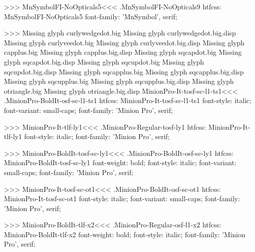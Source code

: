 {>>>
\<MnSymbolFI-NoOpticals5\><<<
.MnSymbolFI-NoOpticals9
htfcss:  MnSymbolFI-NoOpticals5  font-family: 'MnSymbol', serif;

>>>
Missing glyph	curlywedgedot.big
Missing glyph	curlywedgedot.big.disp
Missing glyph	curlyveedot.big
Missing glyph	curlyveedot.big.disp
Missing glyph	capplus.big
Missing glyph	capplus.big.disp
Missing glyph	sqcapdot.big
Missing glyph	sqcapdot.big.disp
Missing glyph	sqcupdot.big
Missing glyph	sqcupdot.big.disp
Missing glyph	sqcapplus.big
Missing glyph	sqcapplus.big.disp
Missing glyph	sqcupplus.big
Missing glyph	sqcupplus.big.disp
Missing glyph	otriangle.big
Missing glyph	otriangle.big.disp
\<MinionPro-It-tosf-sc-l1-ts1\><<<
.MinionPro-BoldIt-osf-sc-l1-ts1
htfcss:  MinionPro-It-tosf-sc-l1-ts1  font-style: italic; font-variant: small-caps; font-family: 'Minion Pro', serif;

>>>
\<MinionPro-It-tlf-ly1\><<<
.MinionPro-Regular-tosf-ly1
htfcss:  MinionPro-It-tlf-ly1  font-style: italic; font-family: 'Minion Pro', serif;

>>>
\<MinionPro-BoldIt-tosf-sc-ly1\><<<
.MinionPro-BoldIt-osf-sc-ly1
htfcss:  MinionPro-BoldIt-tosf-sc-ly1  font-weight: bold; font-style: italic; font-variant: small-caps; font-family: 'Minion Pro', serif;

>>>
\<MinionPro-It-tosf-sc-ot1\><<<
.MinionPro-BoldIt-osf-sc-ot1
htfcss:  MinionPro-It-tosf-sc-ot1  font-style: italic; font-variant: small-caps; font-family: 'Minion Pro', serif;

>>>
\<MinionPro-BoldIt-tlf-x2\><<<
.MinionPro-Regular-osf-l1-x2
htfcss:  MinionPro-BoldIt-tlf-x2  font-weight: bold; font-style: italic; font-family: 'Minion Pro', serif;

}
